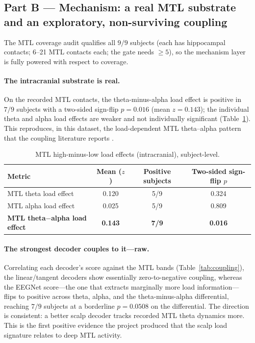 \documentclass[11pt]{article}
\begin{document}
\subsection{Part B --- Mechanism: a real MTL substrate and an exploratory, non-surviving coupling}
\label{sec:resultsB}

The MTL coverage audit qualifies all $9/9$ subjects (each has hippocampal contacts; 6--21 MTL
contacts each; the gate needs $\geq 5$), so the mechanism layer is fully powered with respect to
coverage.

\paragraph{The intracranial substrate is real.} On the recorded MTL contacts, the
theta-minus-alpha load effect is positive in $7/9$ subjects with a two-sided sign-flip
$p=0.016$ (mean $z=0.143$); the individual theta and alpha load effects are weaker and not
individually significant (Table~\ref{tab:substrate}). This reproduces, in this dataset, the
load-dependent MTL theta--alpha pattern that the coupling literature reports
\cite{boran2019persistent}.

\begin{table}[h]
\centering
\caption{MTL high-minus-low load effects (intracranial), subject-level.}
\label{tab:substrate}
\begin{tabular}{lccc}
\toprule
Metric & Mean ($z$) & Positive subjects & Two-sided sign-flip $p$ \\
\midrule
MTL theta load effect & 0.120 & 5/9 & 0.324 \\
MTL alpha load effect & 0.025 & 5/9 & 0.809 \\
\textbf{MTL theta$-$alpha load effect} & \textbf{0.143} & \textbf{7/9} & \textbf{0.016} \\
\bottomrule
\end{tabular}
\end{table}

\paragraph{The strongest decoder couples to it---raw.} Correlating each decoder's score against the
MTL bands (Table~\ref{tab:coupling}), the linear/tangent decoders show essentially zero-to-negative
coupling, whereas the EEGNet score---the one that extracts marginally more load information---flips
to positive across theta, alpha, and the theta-minus-alpha differential, reaching $7/9$ subjects at
a borderline $p=0.0508$ on the differential. The direction is consistent: a better scalp decoder
tracks recorded MTL theta dynamics more. This is the first positive evidence the project produced
that the scalp load signature relates to deep MTL activity.
\end{document}
